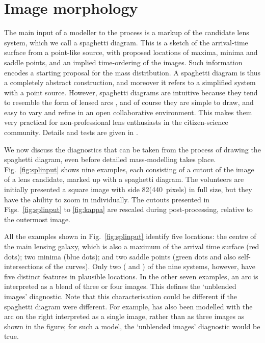 
\section{Image morphology}
\label{sec:morph}

The main input of a modeller to the process is a markup of the
candidate lens system, which we call a spaghetti diagram.  This is a
sketch of the arrival-time surface from a point-like source, with
proposed locations of maxima, minima and saddle points, and an implied
time-ordering of the images.  Such information encodes a starting
proposal for the mass distribution.  A spaghetti diagram is thus a
completely abstract construction, and moreover it refers to a
simplified system with a point source.  However, spaghetti diagrams
are intuitive because they tend to resemble the form of lensed arcs
\citep[see fig.3 of][]{2008MNRAS.383..857F}, and of course they are
simple to draw, and easy to vary and refine in an open collaborative
environment. This makes them very practical for non-professional lens
enthusiasts in the citizen-science community.  Details and tests are
given in \citet{2015MNRAS.447.2170K}.

We now discuss the diagnostics that can be taken from the process of
drawing the spaghetti diagram, even before detailed mass-modelling
takes place.  Fig.~\ref{fig:splinput} shows nine examples, each
consisting of a cutout of the \SW  image of a lens candidate,
marked up with a spaghetti diagram.
The volunteers are initially presented a square image with side
82\arcsec (440~pixels) in full size, but they have the
ability to zoom in individually.
The cutouts presented in Figs.~\ref{fig:splinput} to \ref{fig:kappa}
are rescaled during post-processing, relative to the outermost image.

All the examples shown in Fig.~\ref{fig:splinput} identify five locations:
the centre of the main lensing galaxy, which is also a maximum of the
arrival time surface (red dots); two minima (blue dots); and two
saddle points (green dots and also self-intersections of the curves).
Only two ( and ) of the nine systems, however, have five
distinct features in plausible locations.  In the other seven
examples, an arc is interpreted as a blend of three or four images.
This defines the `unblended images' diagnostic.  Note that this
characterisation could be different if the spaghetti diagram were 
different.  For example,  has also been modelled with the arc on
the right interpreted as a single image, rather than as three images
as shown in the figure; for such a model, the `unblended images'
diagnostic would be true.

